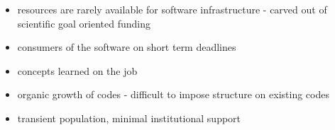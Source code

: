 \begin{itemize}
\item resources are rarely available for software infrastructure - carved out of scientific goal oriented funding
\item consumers of the software on short term deadlines
\item concepts learned on the job
\item organic growth of codes - difficult to impose structure on existing codes
\item transient population, minimal institutional support
\end{itemize}
